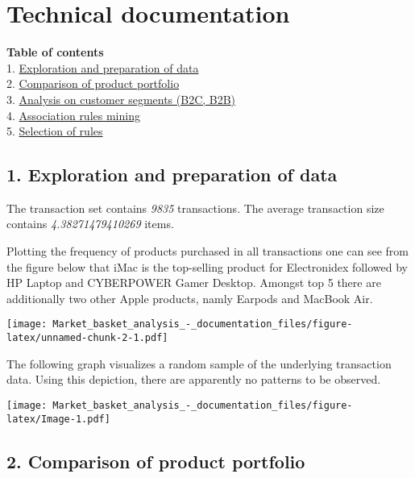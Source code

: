 \documentclass[]{article}
\begin{document}
\hypertarget{technical-documentation}{%
\section{Technical documentation}\label{technical-documentation}}

\textbf{Table of contents}\\
1.
\protect\hyperlink{Explorationux5cux2520andux5cux2520preparationux5cux2520ofux5cux2520data}{Exploration
and preparation of data}\\
2. \protect\hyperlink{Comparison}{Comparison of product portfolio}\\
3. \protect\hyperlink{Customerux5cux2520segments}{Analysis on customer
segments (B2C, B2B)}\\
4. \protect\hyperlink{Associationux5cux2520rules}{Association rules
mining}\\
5. \protect\hyperlink{Selectionux5cux2520ofux5cux2520rules}{Selection of
rules}

\hypertarget{exploration-and-preparation-of-data}{%
\subsection{1. Exploration and preparation of
data}\label{exploration-and-preparation-of-data}}

The transaction set contains \emph{9835} transactions. The average
transaction size contains \emph{4.38271479410269} items.

Plotting the frequency of products purchased in all transactions one can
see from the figure below that iMac is the top-selling product for
Electronidex followed by HP Laptop and CYBERPOWER Gamer Desktop. Amongst
top 5 there are additionally two other Apple products, namly Earpods and
MacBook Air.

\texttt{[image: Market\_basket\_analysis\_-\_documentation\_files/figure-latex/unnamed-chunk-2-1.pdf]}

The following graph visualizes a random sample of the underlying
transaction data. Using this depiction, there are apparently no patterns
to be observed.

\texttt{[image: Market\_basket\_analysis\_-\_documentation\_files/figure-latex/Image-1.pdf]}

\hypertarget{comparison-of-product-portfolio}{%
\subsection{2. Comparison of product
portfolio}\label{comparison-of-product-portfolio}}
\end{document}
